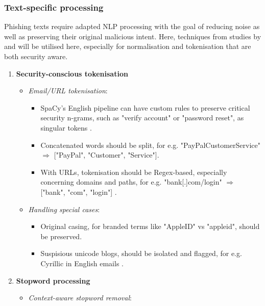 
\subsubsection*{Text-specific processing}
Phishing texts require adapted NLP processing with the goal of reducing noise as well as preserving their original malicious intent. Here, techniques from studies by \cite{do2022deep} and \cite{shirazi2022towards} will be utilised here, especially for normalisation and tokenisation that are both security aware.

\begin{enumerate}
  \item \textbf{Security-conscious tokenisation}
  \begin{itemize}
    \item \textit{Email/URL tokenisation}:
    \begin{itemize}
      \item SpaCy's English pipeline can have custom rules to preserve critical security n-grams, such as "verify account" or "password reset", as singular tokens \citep{van2024applicability}.
      \item Concatenated words should be split, for e.g. "PayPalCustomerService" $\Rightarrow$ ["PayPal", "Customer", "Service"].
      \item With URLs, tokenisation should be Regex-based, especially concerning domains and paths, for e.g. "bank[.]com/login" $\Rightarrow$ ["bank", "com", "login"] \citep{palaniappan2020malicious}.
    \end{itemize}
    \item \textit{Handling special cases}:
    \begin{itemize}
      \item Original casing, for branded terms like "AppleID" vs "appleid", should be preserved.
      \item Suspisious unicode blogs, should be isolated and flagged, for e.g. Cyrillic in English emails \citep{andriu2023adaptive}.
    \end{itemize}
  \end{itemize}
  \item \textbf{Stopword processing}
  \begin{itemize}
    \item \textit{Context-aware stopword removal}:
    \begin{itemize}

\end{itemize}
\end{itemize}
\end{enumerate}

